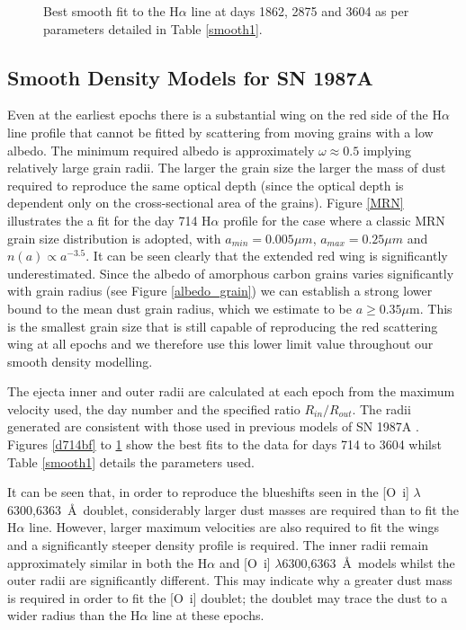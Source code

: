 \documentclass[useAMS,usenatbib,usegraphicx]{mnras}
\begin{document}
\begin{figure}
\begin{center}
\caption{Best smooth fit to the H$\alpha$ line at days 1862, 2875 and 
3604 as per parameters detailed in Table \ref{smooth1}.}
\label{d1862_3604}
\end{center}
\end{figure}

\subsection{Smooth Density Models for SN 1987A}
\label{smooth_models}

Even at the earliest epochs there is a substantial wing on the red side of 
the H$\alpha$ line profile that cannot be fitted by scattering from moving grains with a low albedo.  The 
minimum required albedo is approximately $\omega \approx 0.5$ implying relatively large grain radii.  The larger 
the grain size the larger the mass of dust required to reproduce the same 
optical depth (since the optical depth is dependent only on the 
cross-sectional area of the grains).  Figure \ref{MRN} illustrates the 
a fit for the day 714 H$\alpha$ profile for the case where a classic MRN \citep{Mathis1977} grain size 
distribution is adopted, with $a_{min}=0.005 \mu m$, $a_{max}=0.25 \mu m$ 
and $n(a) \propto a^{-3.5}$.  It can be seen clearly that the extended red wing is 
significantly underestimated.  Since the albedo of  
amorphous carbon grains varies significantly with grain radius (see Figure \ref{albedo_grain}) we can establish a strong 
lower bound to the mean dust grain radius, which we estimate to be $a \ge 0.35\mu$m.  This is the smallest grain size that is still 
capable of reproducing the red scattering wing at all epochs and we 
therefore use this lower limit value throughout our smooth density modelling.

The ejecta inner and outer radii are calculated at each epoch from the maximum 
velocity used, the day number and the specified ratio $R_{in}/R_{out}$.  
The radii generated are consistent with those used in previous models of 
SN 1987A \citep{Ercolano2007, Wesson2015}.  Figures \ref{d714bf} to 
\ref{d1862_3604} show the best fits to the data for days 714 to 3604 whilst 
Table \ref{smooth1} details the parameters used.

It can be seen that, in order to reproduce the blueshifts seen in the 
[O~{\sc i}] $\lambda$6300,6363~\AA\ doublet, considerably larger dust masses 
are required than to fit the H$\alpha$ line.  However, larger maximum 
velocities are also required to fit the wings and a significantly steeper 
density profile is required.  The inner radii remain approximately similar 
in both the H$\alpha$ and [O~{\sc i}] $\lambda$6300,6363~\AA\ models whilst the 
outer radii are significantly different.  This may indicate why a greater 
dust mass is required in order to fit the [O~{\sc i}] doublet; the doublet may
trace the dust to a wider radius than the H$\alpha$ line at these epochs.
\end{document}
